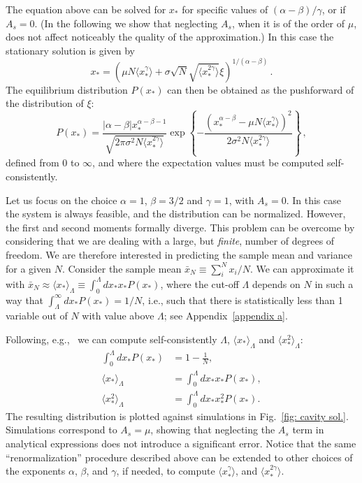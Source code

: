 \documentclass[
 pre,
 twocolumn,
 amsmath,
 amssymb,
 aps,
]{revtex4-2}
\begin{document}
The equation above can be solved for $x_*$ for specific values of
$(\alpha-\beta)/\gamma$, or if $A_s=0$.
(In the following we show that neglecting $A_s$, when it is of the order of $\mu$, does not affect noticeably the quality of the approximation.) In this case the stationary solution is given by 
\begin{equation} \label{eq: cavity solution}
    x_* = \left( \mu N \langle x_*^{\gamma}\rangle + \sigma \sqrt{N} \sqrt{\langle x_*^{2\gamma}\rangle}\xi\right)^{1/(\alpha-\beta)} \, .
\end{equation}
The equilibrium distribution $P(x_*)$ can then be obtained as the pushforward of the distribution of $\xi$: 
\begin{equation}\label{eq: dist general}
    P(x_*)=\frac{|\alpha-\beta|x_*^{\alpha-\beta-1}}{\sqrt{2\pi\sigma^2N \langle x_*^{2\gamma}\rangle}}
    \exp{\left\{-\frac{(x_*^{\alpha-\beta}- \mu N \langle x_*^{\gamma}\rangle)^2}{2\sigma^2N\langle x_*^{2\gamma}\rangle}\right\}} \, ,
\end{equation}
defined from $0$  to $\infty$, and where the expectation values must be computed self-consistently. 

Let us focus on the choice $\alpha=1$, $\beta=3/2$ and $\gamma=1$, with $A_s=0$.  
In this case the system is always feasible, and the distribution can be normalized. 
However, the first and second moments formally diverge.
This problem can be overcome by considering that we are dealing with a large, but \emph{finite}, number of degrees of freedom. 
We are therefore interested in predicting the sample mean and variance for a given $N$. Consider the sample mean $\bar{x}_{N}\equiv\sum_{i}^N x_i /N$. We can approximate it with $\bar{x}_N \approx \langle x_* \rangle_{\Lambda} \equiv \int_0^{\Lambda}dx_*x_*P(x_*)$, where the cut-off $\Lambda$ depends on $N$ in such a way that $\int_{\Lambda}^{\infty}dx_*P(x_*)=1/N$, i.e., such that there is statistically less than 1 variable out of $N$ with value above $\Lambda$; see Appendix~\ref{appendix a}.

Following, e.g.,~\cite{Cui2020,Hatton2024} we can compute self-consistently $\Lambda$, $\langle x_*\rangle_{\Lambda}$ and $\langle x_*^2\rangle_{\Lambda}$:
\begin{align}
    \int_{0}^{\Lambda}dx_*P(x_*) &= 1 - \frac{1}{N} , \\    
    \langle x_* \rangle_{\Lambda} &= \int_0^{\Lambda}dx_*x_*P(x_*) , \\
    \langle x_*^2\rangle_{\Lambda} &= \int_0^{\Lambda}dx_*x_*^2P(x_*) .
\end{align}
The resulting distribution is plotted against simulations in Fig.~\ref{fig: cavity sol.}. 
Simulations correspond to $A_s=\mu$, showing that neglecting the $A_s$ term in analytical expressions does not introduce a significant error. Notice that the same ``renormalization'' procedure described above can be extended to other choices of the exponents $\alpha$, $\beta$, and $\gamma$, if needed, to compute $\langle x_*^{\gamma}\rangle$, and $\langle x_*^{2\gamma}\rangle$.
\end{document}
